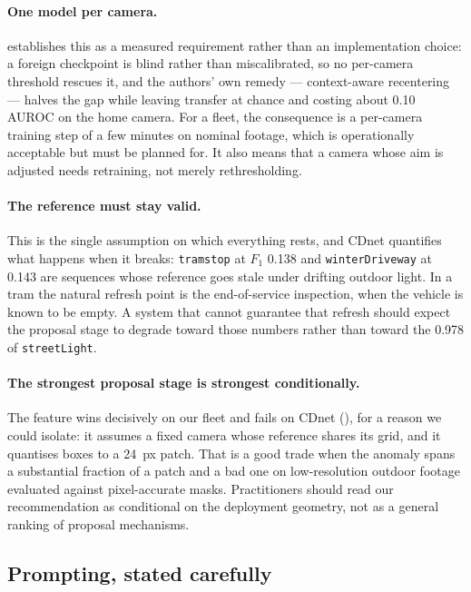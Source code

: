 \paragraph{One model per camera.}
 establishes this as a measured requirement rather
than an implementation choice: a foreign checkpoint is blind rather than
miscalibrated, so no per-camera threshold rescues it, and the authors' own
remedy --- context-aware recentering --- halves the gap while leaving transfer
at chance and costing about 0.10 AUROC on the home camera. For a fleet, the
consequence is a per-camera training step of a few minutes on nominal footage,
which is operationally acceptable but must be planned for. It also means that a
camera whose aim is adjusted needs retraining, not merely rethresholding.

\paragraph{The reference must stay valid.}
This is the single assumption on which everything rests, and CDnet quantifies
what happens when it breaks: \texttt{tramstop} at $F_1$ 0.138 and
\texttt{winterDriveway} at 0.143 are sequences whose reference goes stale under
drifting outdoor light. In a tram the natural refresh point is the end-of-service
inspection, when the vehicle is known to be empty. A system that cannot
guarantee that refresh should expect the proposal stage to degrade toward those
numbers rather than toward the 0.978 of \texttt{streetLight}.

\paragraph{The strongest proposal stage is strongest conditionally.}
The feature \proposer{} wins decisively on our fleet and fails on CDnet
(), for a reason we could isolate: it assumes a fixed
camera whose reference shares its grid, and it quantises boxes to a 24~px
patch. That is a good trade when the anomaly spans a substantial fraction of a
patch and a bad one on low-resolution outdoor footage evaluated against
pixel-accurate masks. Practitioners should read our recommendation as
conditional on the deployment geometry, not as a general ranking of proposal
mechanisms.

\subsection{Prompting, stated carefully}

